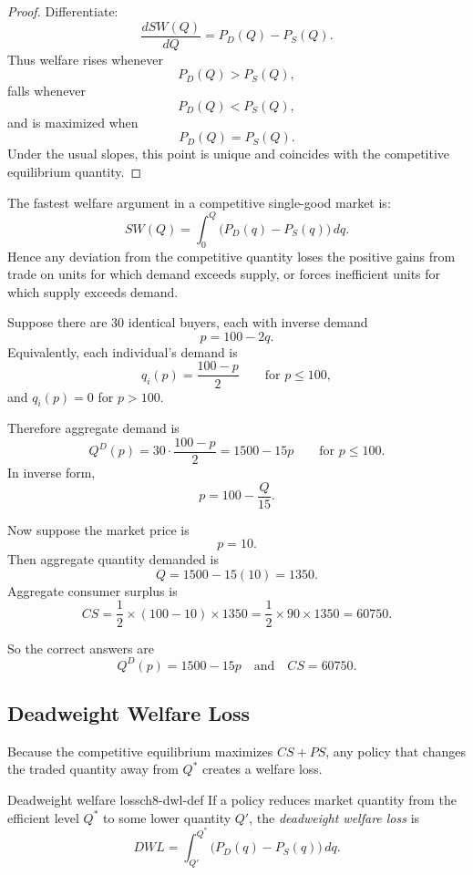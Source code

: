 \begin{proof}
Differentiate:
\[
\frac{dSW(Q)}{dQ}=P_D(Q)-P_S(Q).
\]
Thus welfare rises whenever
\[
P_D(Q)>P_S(Q),
\]
falls whenever
\[
P_D(Q)<P_S(Q),
\]
and is maximized when
\[
P_D(Q)=P_S(Q).
\]
Under the usual slopes, this point is unique and coincides with the competitive equilibrium quantity.
\end{proof}

\begin{examtip}
The fastest welfare argument in a competitive single-good market is:
\[
SW(Q)=\int_0^Q \bigl(P_D(q)-P_S(q)\bigr)\,dq.
\]
Hence any deviation from the competitive quantity loses the positive gains from trade on units for which demand exceeds supply, or forces inefficient units for which supply exceeds demand.
\end{examtip}

\begin{examplebox}[title={Worked Example: aggregate demand and aggregate consumer surplus}]
Suppose there are 30 identical buyers, each with inverse demand
\[
p=100-2q.
\]
Equivalently, each individual's demand is
\[
q_i(p)=\frac{100-p}{2}
\qquad \text{for } p\le 100,
\]
and $q_i(p)=0$ for $p>100$.

Therefore aggregate demand is
\[
Q^D(p)=30\cdot \frac{100-p}{2}=1500-15p
\qquad \text{for } p\le 100.
\]
In inverse form,
\[
p=100-\frac{Q}{15}.
\]

Now suppose the market price is
\[
p=10.
\]
Then aggregate quantity demanded is
\[
Q=1500-15(10)=1350.
\]
Aggregate consumer surplus is
\[
CS=\frac12 \times (100-10)\times 1350
=
\frac12 \times 90 \times 1350
=
60750.
\]

So the correct answers are
\[
\boxed{Q^D(p)=1500-15p}
\quad \text{and} \quad
\boxed{CS=60750.}
\]
\end{examplebox}

\subsection{Deadweight Welfare Loss}

Because the competitive equilibrium maximizes $CS+PS$, any policy that changes the traded quantity away from $Q^*$ creates a welfare loss.

\begin{definition}{Deadweight welfare loss}{ch8-dwl-def}
If a policy reduces market quantity from the efficient level $Q^*$ to some lower quantity $Q'$, the \emph{deadweight welfare loss} is
\[
DWL
=
\int_{Q'}^{Q^*} \bigl(P_D(q)-P_S(q)\bigr)\,dq.
\]
\end{definition}

